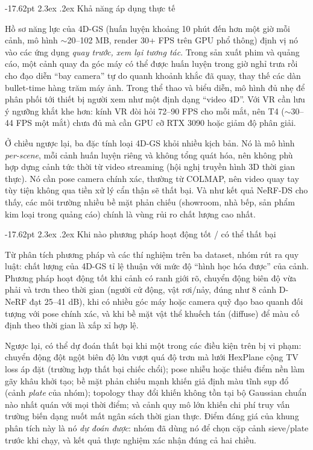 \documentclass[a4paper]{report}
\makeatletter
\renewcommand\section{\@startsection{section}{1}{\z@}%
    {-17.62pt \@plus -5.89pt \@minus -1.18pt}%
    {2.3ex \@plus .2ex}%
    {\normalfont\fontsize{14.95pt}{16.31pt}\selectfont\bfseries}}
\makeatother
\begin{document}
\section{Khả năng áp dụng thực tế}

Hồ sơ năng lực của 4D-GS (huấn luyện khoảng 10 phút đến hơn một giờ mỗi cảnh, mô hình $\sim$20--102 MB, render
30+ FPS trên GPU phổ thông) định vị nó vào các ứng dụng \textit{quay trước, xem
lại tương tác}. Trong sản xuất phim và quảng cáo, một cảnh quay đa góc máy có
thể được huấn luyện trong giờ nghỉ trưa rồi cho đạo diễn ``bay camera'' tự do
quanh khoảnh khắc đã quay, thay thế các dàn bullet-time hàng trăm máy ảnh. Trong
thể thao và biểu diễn, mô hình đủ nhẹ để phân phối tới thiết bị người xem
như một định dạng ``video 4D''. Với VR cần lưu ý ngưỡng khắt khe hơn: kính VR
đòi hỏi 72--90 FPS cho mỗi mắt, nên T4 ($\sim$30--44 FPS một mắt) chưa đủ mà cần GPU
cỡ RTX 3090 hoặc giảm độ phân giải.

Ở chiều ngược lại, ba đặc tính loại 4D-GS khỏi nhiều kịch bản. Nó là mô hình
\textit{per-scene}, mỗi cảnh huấn luyện riêng và không tổng quát hóa, nên không
phù hợp dựng cảnh tức thời từ video streaming (hội nghị truyền hình 3D thời gian
thực). Nó cần pose camera chính xác, thường từ COLMAP, nên video quay tay tùy
tiện không qua tiền xử lý cẩn thận sẽ thất bại. Và như kết quả NeRF-DS cho thấy,
các môi trường nhiều bề mặt phản chiếu (showroom, nhà bếp, sản phẩm kim loại
trong quảng cáo) chính là vùng rủi ro chất lượng cao nhất.

\section{Khi nào phương pháp hoạt động tốt / có thể thất bại}

Từ phân tích phương pháp và các thí nghiệm trên ba dataset, nhóm rút ra quy luật:
chất lượng của 4D-GS tỉ lệ thuận với mức độ ``hình học hóa được'' của cảnh.
Phương pháp hoạt động tốt khi cảnh có ranh giới rõ, chuyển động biên độ vừa
phải và trơn theo thời gian (người cử động, vật rơi/nảy, đúng như 8 cảnh D-NeRF
đạt 25--41 dB), khi có nhiều góc máy hoặc camera quỹ đạo bao quanh đối tượng với
pose chính xác, và khi bề mặt vật thể khuếch tán (diffuse) để màu cố định theo
thời gian là xấp xỉ hợp lệ.

Ngược lại, có thể dự đoán thất bại khi một trong các điều kiện trên bị vi phạm:
chuyển động đột ngột biên độ lớn vượt quá độ trơn mà lưới HexPlane cộng TV loss
áp đặt (trường hợp thất bại chiếc chổi); pose nhiễu hoặc thiếu điểm nền làm gãy khâu
khởi tạo; bề mặt phản chiếu mạnh khiến giả định màu tĩnh sụp đổ (cảnh
\textit{plate} của nhóm); topology thay đổi khiến không tồn tại bộ Gaussian
chuẩn nào nhất quán với mọi thời điểm; và cảnh quy mô lớn khiến chi phí truy vấn
trường biến dạng nuốt mất ngân sách thời gian thực. Điểm đáng giá của khung phân
tích này là nó \textit{dự đoán được}: nhóm đã dùng nó để chọn cặp cảnh
sieve/plate trước khi chạy, và kết quả thực nghiệm xác nhận đúng cả hai chiều.
\end{document}

